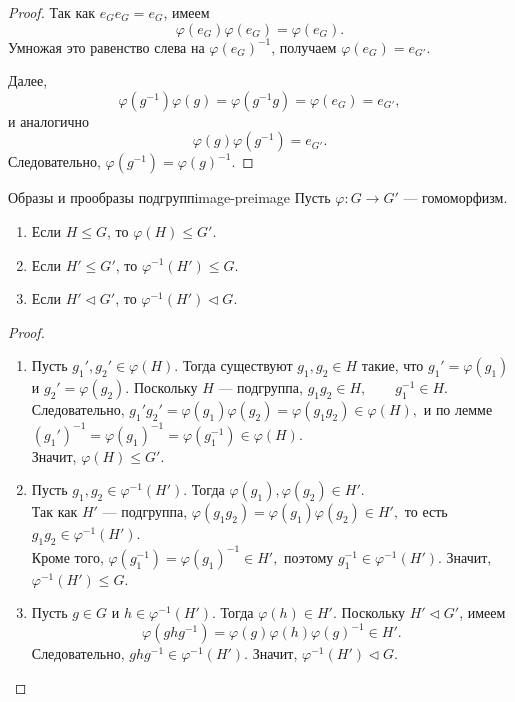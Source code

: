 \begin{proof}
	Так как $e_Ge_G=e_G$, имеем
	\[
	\varphi(e_G)\varphi(e_G)=\varphi(e_G).
	\]
	Умножая это равенство слева на $\varphi(e_G)^{-1}$, получаем $\varphi(e_G)=e_{G'}$.
	
	Далее,
	\[
	\varphi(g^{-1})\varphi(g)=\varphi(g^{-1}g)=\varphi(e_G)=e_{G'},
	\]
	и аналогично
	\[
	\varphi(g)\varphi(g^{-1})=e_{G'}.
	\]
	Следовательно, $\varphi(g^{-1})=\varphi(g)^{-1}$.
\end{proof}

\begin{Proposition}{Образы и прообразы подгрупп}{image-preimage}
	Пусть $\varphi\colon G\to G'$ --- гомоморфизм.
	\begin{enumerate}
		\item Если $H\le G$, то $\varphi(H)\le G'$.
		\item Если $H'\le G'$, то $\varphi^{-1}(H')\le G$.
		\item Если $H'\triangleleft G'$, то $\varphi^{-1}(H')\triangleleft G$.
	\end{enumerate}
\end{Proposition}

\begin{proof}
	\begin{enumerate}
		\item Пусть $g_1',g_2'\in \varphi(H)$. Тогда существуют $g_1,g_2\in H$ такие, что $g_1'=\varphi(g_1)$ и $g_2'=\varphi(g_2)$. Поскольку $H$ --- подгруппа, $g_1g_2\in H, \qquad g_1^{-1}\in H.$\\
		Следовательно, $g_1'g_2' = \varphi(g_1)\varphi(g_2)=\varphi(g_1g_2)\in \varphi(H),$ и по лемме $(g_1')^{-1}=\varphi(g_1)^{-1}=\varphi(g_1^{-1})\in \varphi(H).$\\
		Значит, $\varphi(H)\le G'$.
		
		\item Пусть $g_1,g_2\in \varphi^{-1}(H')$. Тогда $\varphi(g_1),\varphi(g_2)\in H'$.\\
		Так как $H'$ --- подгруппа, $\varphi(g_1g_2)=\varphi(g_1)\varphi(g_2)\in H',$ то есть $g_1g_2\in \varphi^{-1}(H')$.\\
		Кроме того, $\varphi(g_1^{-1})=\varphi(g_1)^{-1}\in H',$ поэтому $g_1^{-1}\in \varphi^{-1}(H')$. Значит, $\varphi^{-1}(H')\le G$.
		
		\item Пусть $g\in G$ и $h\in \varphi^{-1}(H')$. Тогда $\varphi(h)\in H'$. Поскольку $H'\triangleleft G'$, имеем
		\[
		\varphi(ghg^{-1})=\varphi(g)\varphi(h)\varphi(g)^{-1}\in H'.
		\]
		Следовательно, $ghg^{-1}\in \varphi^{-1}(H')$. Значит, $\varphi^{-1}(H')\triangleleft G$.
	\end{enumerate}
\end{proof}

